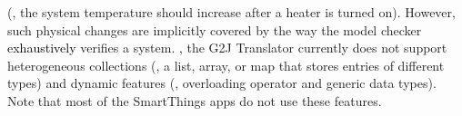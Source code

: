 (\eg, the system temperature should increase after a heater is turned on).
However, such physical changes are implicitly covered by the way the model checker \textcolor{black}{exhaustively} verifies a system.
{\color{black}{\em Fifth}, the G2J Translator currently does not
support heterogeneous collections (\eg, a list, array, or map that stores entries of different types) and
dynamic features (\eg, overloading operator and generic data types). Note that most of the
SmartThings apps do not use these features.}

